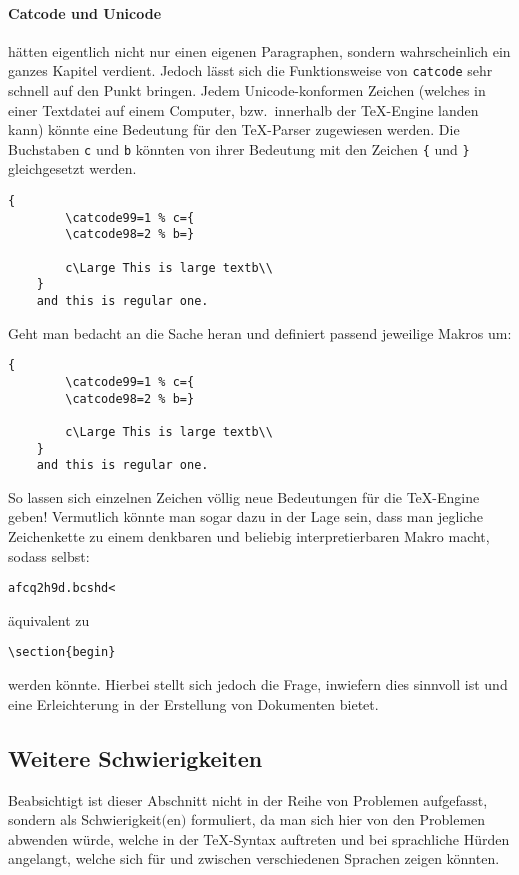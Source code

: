 \paragraph*{Catcode und Unicode} hätten eigentlich nicht nur einen eigenen Paragraphen, sondern wahrscheinlich ein ganzes Kapitel verdient. Jedoch lässt sich die Funktionsweise von \texttt{catcode} sehr schnell auf den Punkt bringen. Jedem Unicode-konformen Zeichen (welches in einer Textdatei auf einem Computer, bzw.\ innerhalb der \TeX{}-Engine landen kann) könnte eine Bedeutung für den \TeX{}-Parser zugewiesen werden. Die Buchstaben \texttt{c} und \texttt{b} könnten von ihrer Bedeutung mit den Zeichen \verb|{| und \verb|}| gleichgesetzt werden. 
\begin{Verbatim}[breaklines=true, breakanywhere=true]
    {
        \catcode99=1 % c={
        \catcode98=2 % b=}
    
        c\Large This is large textb\\
    }
    and this is regular one.
\end{Verbatim}
Geht man bedacht an die Sache heran und definiert passend jeweilige Makros um:
\begin{Verbatim}[breaklines=true, breakanywhere=true]
    {
        \catcode99=1 % c={
        \catcode98=2 % b=}
    
        c\Large This is large textb\\
    }
    and this is regular one.
\end{Verbatim}
So lassen sich einzelnen Zeichen völlig neue Bedeutungen für die \TeX{}-Engine geben! Vermutlich könnte man sogar dazu in der Lage sein, dass man jegliche Zeichenkette zu einem denkbaren und beliebig interpretierbaren Makro macht, sodass selbst:
\begin{Verbatim}[breaklines=true, breakanywhere=true]
    afcq2h9d.bcshd<
\end{Verbatim} 
äquivalent zu 
\begin{Verbatim}[breaklines=true, breakanywhere=true]
    \section{begin}
\end{Verbatim} 
werden könnte. Hierbei stellt sich jedoch die Frage, inwiefern dies sinnvoll ist und eine Erleichterung in der Erstellung von Dokumenten bietet.

\subsection{Weitere Schwierigkeiten}\label{subsec:weitereschwierigkeiten}
Beabsichtigt ist dieser Abschnitt nicht in der Reihe von Problemen aufgefasst, sondern als Schwierigkeit$($en$)$ formuliert, da man sich hier von den Problemen abwenden würde, welche in der \TeX{}-Syntax auftreten und bei sprachliche Hürden angelangt, welche sich für und zwischen verschiedenen Sprachen zeigen könnten.

